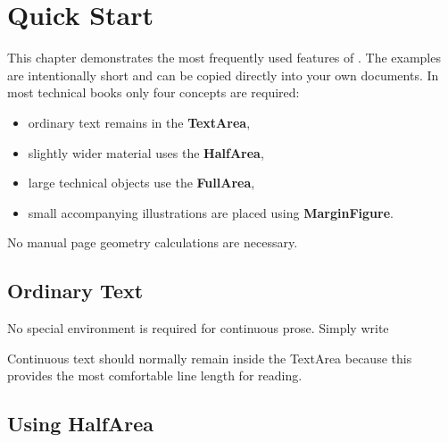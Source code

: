 \documentclass[
11pt,
a4paper,
oneside
]{scrbook}
\begin{document}

\chapter{Quick Start}
\label{chap:quickstart}
\begin{MarginFigure}
\end{MarginFigure}
This chapter demonstrates the most frequently used features of
\MDWordmark.
The examples are intentionally short and can be copied directly into your own
documents.
In most technical books only four concepts are required:
\begin{itemize}
	\item ordinary text remains in the \textbf{TextArea},
	\item slightly wider material uses the \textbf{HalfArea},
	\item large technical objects use the \textbf{FullArea},
	\item small accompanying illustrations are placed using
	\textbf{MarginFigure}.
\end{itemize}
No manual page geometry calculations are necessary.


\section{Ordinary Text}

No special environment is required for continuous prose.
Simply write




Continuous text should normally remain inside the TextArea because this
provides the most comfortable line length for reading.


\section{Using HalfArea}
\end{document}

